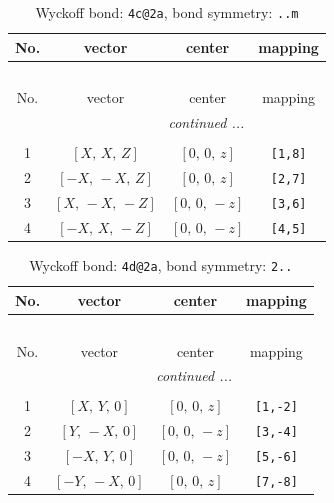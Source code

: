 \documentclass[fleqn,8pt]{jsarticle}
\begin{document}
\renewcommand{\arraystretch}{1.2}
\begin{longtable}{cccc}
\caption{Wyckoff bond: {\tt 4c@2a}, bond symmetry: {\tt ..m}}
 \\
 \hline \hline
No. & vector & center & mapping \\ \hline \endfirsthead

\multicolumn{3}{l}{\tablename\ \thetable{}} \\
 \hline \hline
No. & vector & center & mapping \\ \hline \endhead

 \hline \hline
\multicolumn{3}{r}{\footnotesize\it continued ...} \\ \endfoot

 \hline \hline
\multicolumn{3}{r}{} \\ \endlastfoot

1 & $\left[ X,\, X,\, Z \right]$ & $\left[ 0,\, 0,\, z \right]$ & {\tt [1,8]} \\ \hline
2 & $\left[ - X,\, - X,\, Z \right]$ & $\left[ 0,\, 0,\, z \right]$ & {\tt [2,7]} \\ \hline
3 & $\left[ X,\, - X,\, - Z \right]$ & $\left[ 0,\, 0,\, - z \right]$ & {\tt [3,6]} \\ \hline
4 & $\left[ - X,\, X,\, - Z \right]$ & $\left[ 0,\, 0,\, - z \right]$ & {\tt [4,5]} \\
\end{longtable}
\renewcommand{\arraystretch}{1.2}
\begin{longtable}{cccc}
\caption{Wyckoff bond: {\tt 4d@2a}, bond symmetry: {\tt 2..}}
 \\
 \hline \hline
No. & vector & center & mapping \\ \hline \endfirsthead

\multicolumn{3}{l}{\tablename\ \thetable{}} \\
 \hline \hline
No. & vector & center & mapping \\ \hline \endhead

 \hline \hline
\multicolumn{3}{r}{\footnotesize\it continued ...} \\ \endfoot

 \hline \hline
\multicolumn{3}{r}{} \\ \endlastfoot

1 & $\left[ X,\, Y,\, 0 \right]$ & $\left[ 0,\, 0,\, z \right]$ & {\tt [1,-2]} \\ \hline
2 & $\left[ Y,\, - X,\, 0 \right]$ & $\left[ 0,\, 0,\, - z \right]$ & {\tt [3,-4]} \\ \hline
3 & $\left[ - X,\, Y,\, 0 \right]$ & $\left[ 0,\, 0,\, - z \right]$ & {\tt [5,-6]} \\ \hline
4 & $\left[ - Y,\, - X,\, 0 \right]$ & $\left[ 0,\, 0,\, z \right]$ & {\tt [7,-8]} \\
\end{longtable}
\end{document}
